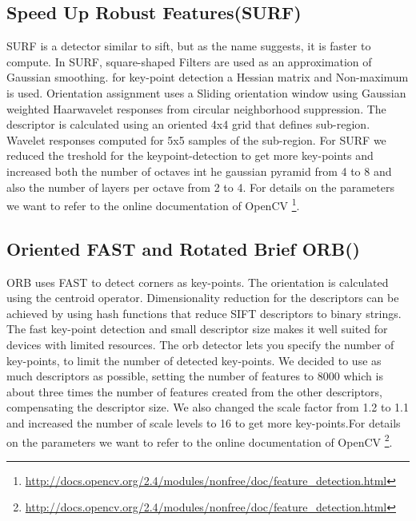 \documentclass[10pt,a4paper,twocolumn]{article}
\begin{document}
\subsection{Speed Up Robust Features(SURF)}
SURF \cite{surf} is a detector similar to sift, but as the name suggests, it is faster to compute. In SURF, square-shaped Filters are used as an approximation of Gaussian smoothing. for key-point detection a Hessian matrix and Non-maximum is used. Orientation assignment uses a Sliding orientation window using Gaussian weighted Haarwavelet responses from circular neighborhood suppression. The descriptor is calculated using an oriented 4x4 grid that defines sub-region.
Wavelet responses computed for 5x5 samples of the sub-region. For SURF we reduced the treshold  for the keypoint-detection to get more key-points and  increased both the number of octaves int he gaussian pyramid from 4 to 8 and also the number of layers per octave from 2 to 4. For details on the parameters we want to refer to the online documentation of OpenCV \footnote{\url{http://docs.opencv.org/2.4/modules/nonfree/doc/feature_detection.html}}.

\subsection{Oriented FAST and Rotated Brief ORB()}
ORB \cite{orb} uses FAST \cite{fast1} \cite{fast2} to detect corners as key-points. The orientation is calculated using the centroid operator. Dimensionality reduction for the descriptors can be achieved by using hash functions that reduce SIFT descriptors to binary strings. The fast key-point detection and small descriptor size makes it well suited for devices with limited resources. The orb detector lets you specify the number of key-points, to limit the number of detected key-points. We decided to use as much descriptors as possible, setting the number of features to 8000 which is about three times the number of features created from the other descriptors, compensating the descriptor size. We also changed the scale factor from 1.2 to 1.1 and increased the number of scale levels to 16 to get more key-points.For details on the parameters we want to refer to the online documentation of OpenCV \footnote{\url{http://docs.opencv.org/2.4/modules/nonfree/doc/feature_detection.html}}.
\end{document}
